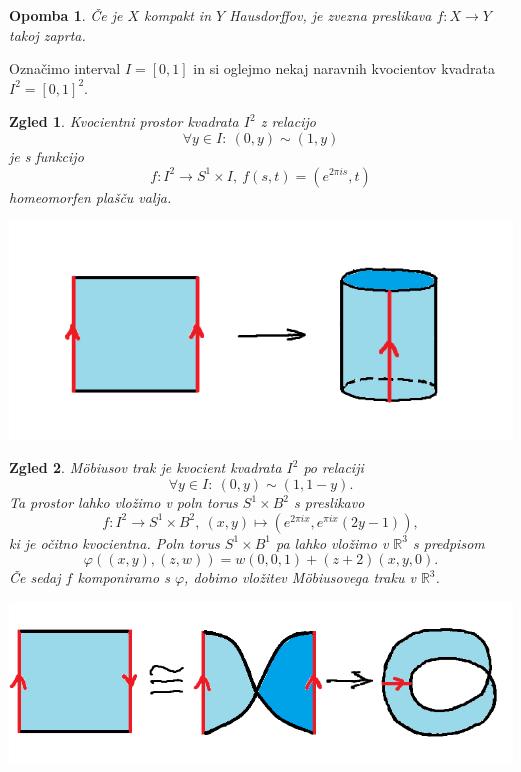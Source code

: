 \documentclass[10pt, a4paper]{article}
\newtheorem*{opomba}{Opomba}
\newtheorem{zgled}{Zgled}[section]
\newcommand{\R}{\mathbb {R}}
\begin{document}
\begin{opomba}
  Če je $X$ kompakt in $Y$ Hausdorffov, je zvezna preslikava $f: X \to Y$ takoj zaprta.
\end{opomba}

Označimo interval $I = [0, 1]$ in si oglejmo nekaj naravnih kvocientov kvadrata $I^2 = [0, 1]^2$.

\begin{zgled}
  Kvocientni prostor kvadrata $I^2$ z relacijo 
    $$\forall y \in I:\ (0, y) \sim (1, y)$$ je s funkcijo $$f: I^2 \to S^1 \times I,\ f(s, t) = (e^{2 \pi i s}, t)$$
    homeomorfen plašču valja.
    \begin{center}
      \includegraphics[scale=0.7]{zgled1.png}
    \end{center}
\end{zgled}

\begin{zgled}
  Möbiusov trak je kvocient kvadrata $I^2$ po relaciji $$\forall y \in I:\ (0, y) \sim (1, 1 - y).$$
  Ta prostor lahko vložimo v poln torus $S^1 \times B^2$ s preslikavo 
  $$f: I^2 \to S^1 \times B^2,\ (x, y) \mapsto (e^{2\pi i x}, e^{\pi i x} (2y - 1)),$$
  ki je očitno kvocientna.
  Poln torus $S^1 \times B^1$ pa lahko vložimo v $\R^3$ s predpisom 
  $$\varphi((x, y), (z, w)) = w(0, 0, 1) + (z + 2)(x, y, 0).$$
  Če sedaj $f$ komponiramo s $\varphi$, dobimo vložitev Möbiusovega traku 
  v $\R^3$.
  \begin{center}
    \includegraphics[scale=0.5]{zgled2.png}
  \end{center}
\end{zgled}
\end{document}
